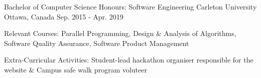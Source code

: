 
\begin{cventries}
	\cventry
		{Bachelor of Computer Science Honours: Software Engineering}
		{Carleton University}
		{Ottawa, Canada}
		{Sep. 2015 - Apr. 2019}
		{\begin{cvitems}
			\item Relevant Courses: Parallel Programming, Design \& Analysis of Algorithms, Software Quality Assurance, Software Product Management
			\item Extra-Curricular Activities: Student-lead hackathon organiser responsible for the website \& Campus safe walk program voluteer
		\end{cvitems}}
\end{cventries}